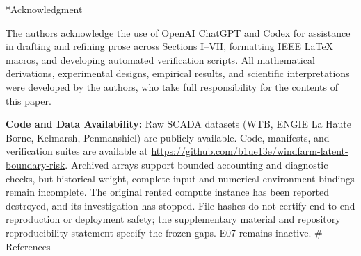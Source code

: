\documentclass[
  journal]{IEEEtran}
\makeatletter
\def\section{\@startsection{section}{1}{\z@}{0.75ex plus 0.15ex minus 0.1ex}{0.25ex plus 0.08ex}{\normalfont\footnotesize\bfseries\centering\scshape}}
\makeatother
\begin{document}
\section*{Acknowledgment}\label{acknowledgment}

The authors acknowledge the use of OpenAI ChatGPT and Codex for
assistance in drafting and refining prose across Sections I--VII,
formatting IEEE LaTeX macros, and developing automated verification
scripts. All mathematical derivations, experimental designs, empirical
results, and scientific interpretations were developed by the authors,
who take full responsibility for the contents of this paper.

\textbf{Code and Data Availability:} Raw SCADA datasets (WTB, ENGIE La
Haute Borne, Kelmarsh, Penmanshiel) are publicly available. Code,
manifests, and verification suites are available at
\url{https://github.com/b1ue13e/windfarm-latent-boundary-risk}. Archived
arrays support bounded accounting and diagnostic checks, but historical
weight, complete-input and numerical-environment bindings remain
incomplete. The original rented compute instance has been reported
destroyed, and its investigation has stopped. File hashes do not certify
end-to-end reproduction or deployment safety; the supplementary material
and repository reproducibility statement specify the frozen gaps. E07
remains inactive. \# References
\end{document}
